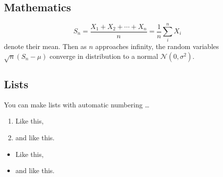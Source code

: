 \subsection*{Mathematics}


$$S_n = \frac{X_1 + X_2 + \cdots + X_n}{n}
= \frac{1}{n}\sum_{i}^{n} X_i$$
denote their mean. Then as $n$ approaches infinity, the random variables $\sqrt{n}(S_n - \mu)$ converge in distribution to a normal $\mathcal{N}(0, \sigma^2)$.


\subsection*{Lists}


You can make lists with automatic numbering \dots


\begin{enumerate}
\item Like this,
\item and like this.
\end{enumerate}
\begin{itemize}
\item Like this,
\item and like this.
\end{itemize}
